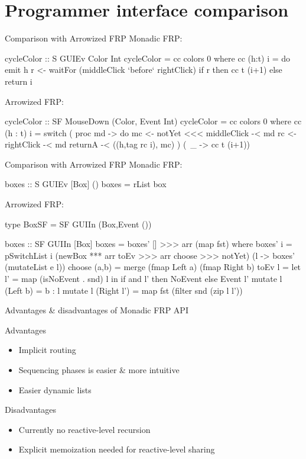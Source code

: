 \documentclass{beamer}
\begin{document}
\section{Programmer interface comparison}
\begin{frame}{Comparison with Arrowized FRP}
Monadic FRP:
\begin{code}
cycleColor :: S GUIEv Color Int
cycleColor = cc colors 0 where
  cc (h:t) i = do
    emit h
    r <- waitFor (middleClick `before` rightClick)
    if r then cc t (i+1) else return i
\end{code}
Arrowized FRP:
\begin{code}
cycleColor :: SF MouseDown (Color, Event Int)
cycleColor = cc colors 0 where
  cc (h : t) i = switch ( proc md -> do
      mc  <- notYet <<< middleClick  -< md
      rc  <- rightClick              -< md
      returnA -< ((h,tag rc i), mc)
    ) (\ _ -> cc t (i+1))
\end{code}

\end{frame}

\begin{frame}{Comparison with Arrowized FRP}
Monadic FRP:
\begin{code}
boxes :: S GUIEv [Box] ()
boxes = rList box
\end{code}
Arrowized FRP:
\begin{code}
type BoxSF  = SF GUIIn (Box,Event ())

boxes :: SF GUIIn [Box]
boxes = boxes' [] >>> arr (map fst) where
  boxes' i = pSwitchList i
    (newBox *** arr toEv >>> arr choose >>> notYet)
    (\e l -> boxes' (mutateList e l))
choose (a,b) = merge (fmap Left a) (fmap Right b)
toEv l =  let l' = map (isNoEvent . snd) l 
          in if and l' then NoEvent else Event l'
mutate l (Left b)   = b : l
mutate l (Right l') = map fst (filter snd (zip l l'))
\end{code}
\end{frame}

\begin{frame}{Advantages \& disadvantages of Monadic FRP API}
\begin{block}{Advantages}
\begin{itemize}
\item Implicit routing
\item Sequencing phases is easier \& more intuitive
\item Easier dynamic lists 
\end{itemize}
\end{block}
\begin{block}{Disadvantages}
\begin{itemize}
\item Currently no reactive-level recursion
\item Explicit memoization needed for reactive-level sharing
\end{itemize}
\end{block}
\end{frame}
\end{document}
